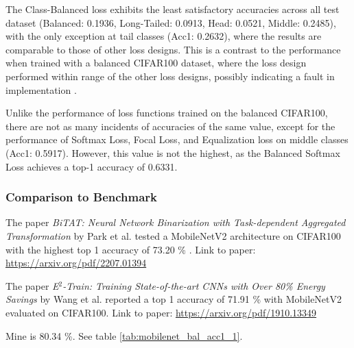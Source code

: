 The Class-Balanced loss exhibits the least satisfactory accuracies across all test dataset (Balanced: 0.1936, Long-Tailed: 0.0913, Head: 0.0521, Middle: 0.2485), with the only exception at tail classes (Acc1: 0.2632), where the results are comparable to those of other loss designs. This is a contrast to the performance when trained with a balanced CIFAR100 dataset, where the loss design performed within range of the other loss designs, possibly indicating a fault in implementation .

Unlike the performance of loss functions trained on the balanced CIFAR100, there are not as many incidents of accuracies of the same value, except for the performance of Softmax Loss, Focal Loss, and Equalization loss on middle classes (Acc1: 0.5917). However, this value is not the highest, as the Balanced Softmax Loss achieves a top-1 accuracy of 0.6331. 

\subsubsection{Comparison to Benchmark}
The paper \textit{BiTAT: Neural Network Binarization
with Task-dependent Aggregated Transformation} by Park et al. tested a MobileNetV2 architecture on CIFAR100 with the highest top 1 accuracy of 73.20 \% .
Link to paper: \url{https://arxiv.org/pdf/2207.01394}

The paper \textit{E$^2$-Train: Training State-of-the-art CNNs with Over
80\% Energy Savings} by Wang et al. reported a top 1 accuracy of 71.91 \% with MobileNetV2 evaluated on CIFAR100.
Link to paper: \url{https://arxiv.org/pdf/1910.13349}

Mine is 80.34 \%. See table \ref{tab:mobilenet_bal_acc1_1}.




